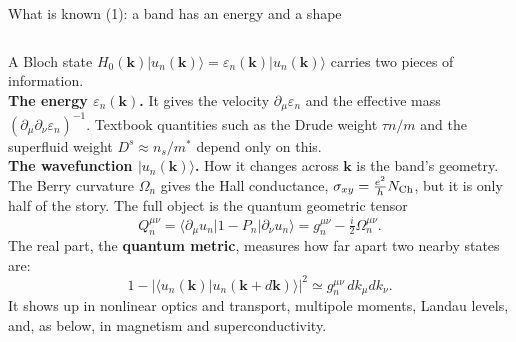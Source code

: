 \documentclass[aspectratio=169,11pt]{beamer}
\newcommand{\bk}{\mathbf{k}}
\begin{document}
\begin{frame}{What is known (1): a band has an energy and a shape}
\begin{columns}[T]
\small
A Bloch state $H_0(\bk)|u_n(\bk)\rangle=\varepsilon_n(\bk)|u_n(\bk)\rangle$ carries two pieces of information.\\[6pt]
\textbf{The energy $\varepsilon_n(\bk)$.} It gives the velocity $\partial_\mu\varepsilon_n$ and the
effective mass $(\partial_\mu\partial_\nu\varepsilon_n)^{-1}$. Textbook quantities such as the Drude weight
$\tau n/m$ and the superfluid weight $D^s\approx n_s/m^*$ depend only on this.\\[6pt]
\textbf{The wavefunction $|u_n(\bk)\rangle$.} How it changes across $\bk$ is the band's geometry.
\small
The Berry curvature $\Omega_n$ gives the Hall conductance, $\sigma_{xy}=\tfrac{e^2}{h}N_{\rm Ch}$,
but it is only half of the story. The full object is the quantum geometric tensor
\[
Q_n^{\mu\nu}=\langle\partial_\mu u_n|1-P_n|\partial_\nu u_n\rangle=g_n^{\mu\nu}-\tfrac{i}{2}\Omega_n^{\mu\nu}.
\]
The real part, the \textbf{quantum metric}, measures how far apart two nearby states are:
\[
1-|\langle u_n(\bk)|u_n(\bk+d\bk)\rangle|^2\simeq g_n^{\mu\nu}\,dk_\mu dk_\nu .
\]
{\footnotesize It shows up in nonlinear optics and transport, multipole moments, Landau levels,
and, as below, in magnetism and superconductivity.}
\end{columns}
\end{frame}
\end{document}
